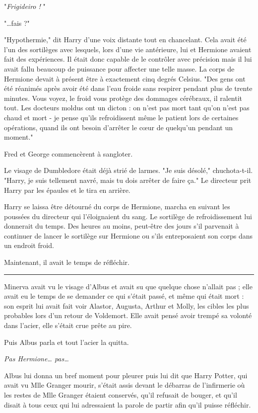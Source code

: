"\emph{Frigideiro !} "

"…fais ?"

"Hypothermie," dit Harry d'une voix distante tout en chancelant. Cela avait été l'un des sortilèges avec lesquels, lors d'une vie antérieure, lui et Hermione avaient fait des expériences. Il était donc capable de le contrôler avec précision mais il lui avait fallu beaucoup de puissance pour affecter une telle masse. La corps de Hermione devait à présent être à exactement cinq degrés Celsius. "Des gens ont été réanimés après avoir été dans l'eau froide sans respirer pendant plus de trente minutes. Vous voyez, le froid vous protège des dommages cérébraux, il ralentit tout. Les docteurs moldus ont un dicton : on n'est pas mort tant qu'on n'est pas chaud et mort - je pense qu'ils refroidissent même le patient lors de certaines opérations, quand ils ont besoin d'arrêter le cœur de quelqu'un pendant un moment."

Fred et George commencèrent à sangloter.

Le visage de Dumbledore était déjà strié de larmes. "Je suis désolé," chuchota-t-il. "Harry, je suis tellement navré, mais tu dois arrêter de faire ça." Le directeur prit Harry par les épaules et le tira en arrière.

Harry se laissa être détourné du corps de Hermione, marcha en suivant les poussées du directeur qui l'éloignaient du sang. Le sortilège de refroidissement lui donnerait du temps. Des heures au moins, peut-être des jours s'il parvenait à continuer de lancer le sortilège sur Hermione ou s'ils entreposaient son corps dans un endroit froid.

Maintenant, il avait le temps de réfléchir.
\par\noindent\rule{\textwidth}{0.4pt}
Minerva avait vu le visage d'Albus et avait su que quelque chose n'allait pas ; elle avait eu le temps de se demander ce qui s'était passé, et même qui était mort : son esprit lui avait fait voir Alastor, Augusta, Arthur et Molly, les cibles les plus probables lors d'un retour de Voldemort. Elle avait pensé avoir trempé sa volonté dans l'acier, elle s'était crue prête au pire.

Puis Albus parla et tout l'acier la quitta.

\emph{Pas Hermione… pas…} 

Albus lui donna un bref moment pour pleurer puis lui dit que Harry Potter, qui avait vu Mlle Granger mourir, s'était assis devant le débarras de l'infirmerie où les restes de Mlle Granger étaient conservés, qu'il refusait de bouger, et qu'il disait à tous ceux qui lui adressaient la parole de partir afin qu'il puisse réfléchir.

